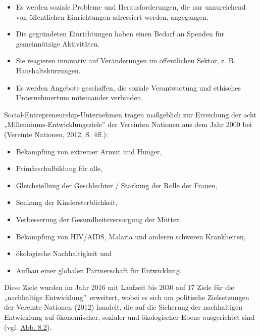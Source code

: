 \documentclass[
  letterpaper,
]{book}
\begin{document}
\begin{itemize}
\item
  Es werden soziale Probleme und Herausforderungen, die nur unzureichend
  von öffentlichen Einrichtungen adressiert werden, angegangen.
\item
  Die gegründeten Einrichtungen haben einen Bedarf an Spenden für
  gemeinnützige Aktivitäten.
\item
  Sie reagieren innovativ auf Veränderungen im öffentlichen Sektor, z.
  B. Haushaltskürzungen.
\item
  Es werden Angebote geschaffen, die soziale Verantwortung und ethisches
  Unternehmertum miteinander verbinden.
\end{itemize}

Social-Entrepreneurship-Unternehmen tragen maßgeblich zur Erreichung der
acht „Millenniums-Entwicklungsziele'' der Vereinten Nationen aus dem
Jahr 2000 bei (Vereinte Nationen, 2012, S. 4ff.):

\begin{itemize}
\item
  Bekämpfung von extremer Armut und Hunger,
\item
  Primärschulbildung für alle,
\item
  Gleichstellung der Geschlechter / Stärkung der Rolle der Frauen,
\item
  Senkung der Kindersterblichkeit,
\item
  Verbesserung der Gesundheitsversorgung der Mütter,
\item
  Bekämpfung von HIV/AIDS, Malaria und anderen schweren Krankheiten,
\item
  ökologische Nachhaltigkeit und
\item
  Aufbau einer globalen Partnerschaft für Entwicklung.
\end{itemize}

Diese Ziele wurden im Jahr 2016 mit Laufzeit bis 2030 auf 17 Ziele für
die „nachhaltige Entwicklung''~erweitert, wobei es sich um politische
Zielsetzungen der Vereinte Nationen (2012) handelt, die auf die
Sicherung der nachhaltigen Entwicklung auf ökonomischer, sozialer und
ökologischer Ebene ausgerichtet sind (vgl. \hyperref[figure82]{Abb.
8.2}).
\end{document}
